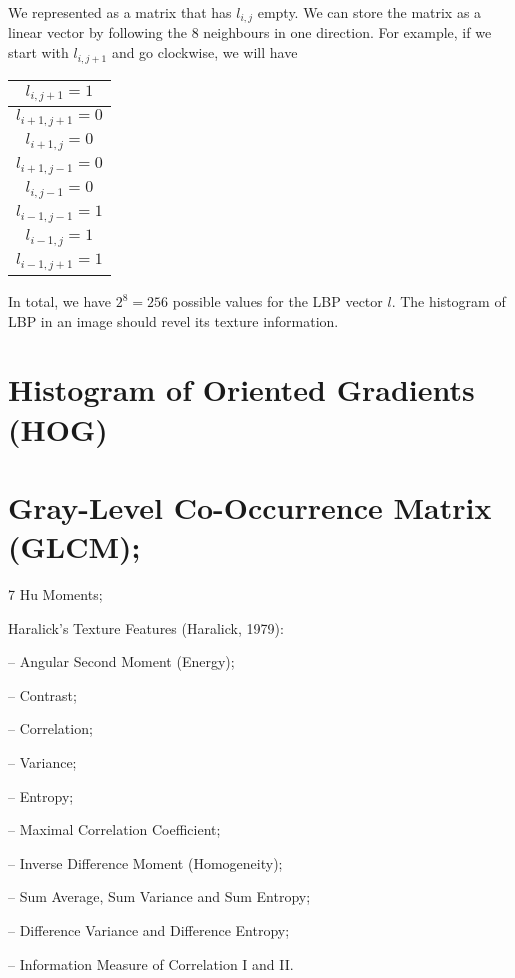 We represented as a matrix
that has $l_{i, j}$ empty.
We can store the matrix as a linear vector
by following the 8 neighbours in one direction.
For example,
if we start with $l_{i, j + 1}$
and go clockwise,
we will have

\begin{center}
\begin{tabular}{|c|}
  \hline $l_{i, j + 1} = 1$ \\
  \hline $l_{i + 1, j + 1} = 0$ \\
  \hline $l_{i + 1, j} = 0$ \\
  \hline $l_{i + 1, j - 1} = 0$ \\
  \hline $l_{i, j - 1} = 0$ \\
  \hline $l_{i - 1, j - 1} = 1$ \\
  \hline $l_{i - 1, j} = 1$ \\
  \hline $l_{i - 1, j + 1} = 1$ \\
  \hline
\end{tabular}
\end{center}

In total,
we have $2^8 = 256$ possible values for the LBP vector $l$.
The histogram of LBP in an image
should revel its texture information.



\section{Histogram of Oriented Gradients (HOG)}

\section{Gray-Level Co-Occurrence Matrix (GLCM);}

7 Hu Moments;

Haralick’s Texture Features (Haralick, 1979):

– Angular Second Moment (Energy);

– Contrast;

– Correlation;

– Variance;

– Entropy;

– Maximal Correlation Coefficient;

– Inverse Difference Moment (Homogeneity);

– Sum Average, Sum Variance and Sum Entropy;

– Difference Variance and Difference Entropy;

– Information Measure of Correlation I and II.




